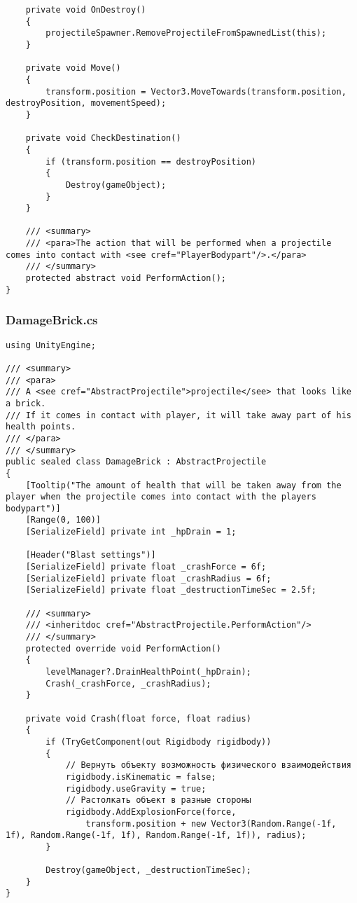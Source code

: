 \begin{verbatim}
    private void OnDestroy()
    {
        projectileSpawner.RemoveProjectileFromSpawnedList(this);
    }

    private void Move()
    {
        transform.position = Vector3.MoveTowards(transform.position, destroyPosition, movementSpeed);
    }

    private void CheckDestination()
    {
        if (transform.position == destroyPosition)
        {
            Destroy(gameObject);
        }
    }

    /// <summary>
    /// <para>The action that will be performed when a projectile comes into contact with <see cref="PlayerBodypart"/>.</para>
    /// </summary>
    protected abstract void PerformAction();
}
\end{verbatim}
\subsubsection*{DamageBrick.cs}
\begin{verbatim}
using UnityEngine;

/// <summary>
/// <para>
/// A <see cref="AbstractProjectile">projectile</see> that looks like a brick.
/// If it comes in contact with player, it will take away part of his health points.
/// </para>
/// </summary>
public sealed class DamageBrick : AbstractProjectile
{
    [Tooltip("The amount of health that will be taken away from the player when the projectile comes into contact with the players bodypart")]
    [Range(0, 100)]
    [SerializeField] private int _hpDrain = 1;
    
    [Header("Blast settings")]
    [SerializeField] private float _crashForce = 6f;
    [SerializeField] private float _crashRadius = 6f;
    [SerializeField] private float _destructionTimeSec = 2.5f;

    /// <summary>
    /// <inheritdoc cref="AbstractProjectile.PerformAction"/>
    /// </summary>
    protected override void PerformAction()
    {
        levelManager?.DrainHealthPoint(_hpDrain);
        Crash(_crashForce, _crashRadius);
    }

    private void Crash(float force, float radius)
    {
        if (TryGetComponent(out Rigidbody rigidbody))
        {
            // Вернуть объекту возможность физического взаимодействия
            rigidbody.isKinematic = false;
            rigidbody.useGravity = true;
            // Растолкать объект в разные стороны
            rigidbody.AddExplosionForce(force,
                transform.position + new Vector3(Random.Range(-1f, 1f), Random.Range(-1f, 1f), Random.Range(-1f, 1f)), radius);
        }

        Destroy(gameObject, _destructionTimeSec);
    }
}
\end{verbatim}

